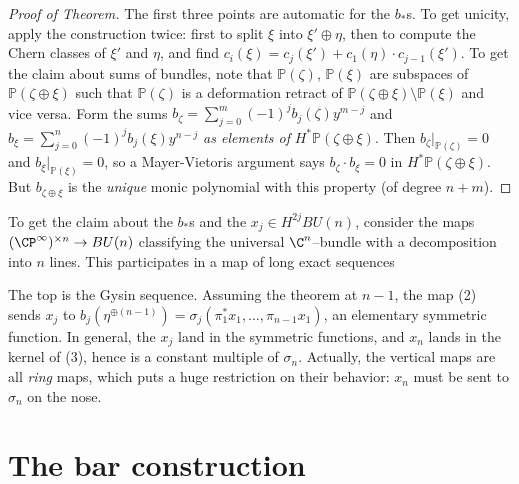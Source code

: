 \begin{proof}[Proof of Theorem]
The first three points are automatic for the $b_*$s.  To get unicity, apply the construction twice: first to split $\xi$ into $\xi' \oplus \eta$, then to compute the Chern classes of $\xi'$ and $\eta$, and find $c_i(\xi) = c_j(\xi') + c_1(\eta) \cdot c_{j-1}(\xi')$.  To get the claim about sums of bundles, note that $\mathbb P(\zeta)$, $\mathbb P(\xi)$ are subspaces of $\mathbb P(\zeta \oplus \xi)$ such that $\mathbb P(\zeta)$ is a deformation retract of $\mathbb P(\zeta \oplus \xi) \setminus \mathbb P(\xi)$ and vice versa.  Form the sums $b_\zeta = \sum_{j=0}^m (-1)^j b_j(\zeta) y^{m-j}$ and $b_\xi = \sum_{j=0}^n (-1)^j b_j(\xi) y^{n-j}$ \emph{as elements of} $H^* \mathbb P(\zeta \oplus \xi)$.  Then $b_\zeta|_{\mathbb P(\zeta)} = 0$ and $b_\xi|_{\mathbb P(\xi)} = 0$, so a Mayer-Vietoris argument says $b_\zeta \cdot b_\xi = 0$ in $H^* \mathbb P(\zeta \oplus \xi)$.  But $b_{\zeta \oplus \xi}$ is the \emph{unique} monic polynomial with this property (of degree $n + m$).
\end{proof}

To get the claim about the $b_*$s and the $x_j \in H^{2j} BU(n)$, consider the maps $(\CP^\infty)^{\times n} \to BU(n)$ classifying the universal $\C^n$--bundle with a decomposition into $n$ lines.  This participates in a map of long exact sequences
\begin{center}
\end{center}
The top is the Gysin sequence.  Assuming the theorem at $n - 1$, the map (2) sends $x_j$ to $b_j(\eta^{\oplus(n-1)}) = \sigma_j(\pi_1^* x_1, \ldots, \pi_{n-1} x_1)$, an elementary symmetric function.  In general, the $x_j$ land in the symmetric functions, and $x_n$ lands in the kernel of (3), hence is a constant multiple of $\sigma_n$.  Actually, the vertical maps are all \emph{ring} maps, which puts a huge restriction on their behavior: $x_n$ must be sent to $\sigma_n$ on the nose.




\section{The bar construction}

